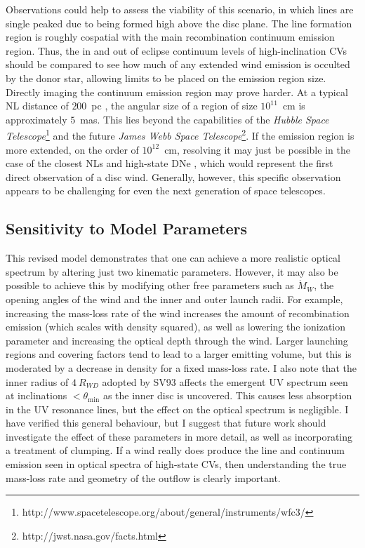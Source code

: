 Observations could help to assess the viability of this scenario, in which lines 
are single peaked due to being formed high above the disc plane. The line formation
region is roughly cospatial with the main recombination continuum emission region.
Thus, the in and out of eclipse continuum levels of high-inclination CVs should be 
compared to see how much of any extended wind emission is occulted by the 
donor star, allowing limits to be placed on
the emission region size. Directly imaging the continuum emission region may prove harder.
At a typical NL distance of $200$~pc \citep[e.g.][]{knigge2006,mizusawa2010}, 
the angular size of a region of size $10^{11}$~cm is approximately $5$~mas. This lies beyond the 
capabilities of the 
{\sl Hubble Space Telescope}\footnote{http://www.spacetelescope.org/about/general/instruments/wfc3/} 
and the future 
{\sl James Webb Space Telescope}\footnote{http://jwst.nasa.gov/facts.html}.
If the emission region is more extended, on the order of $10^{12}$~cm, resolving it may just 
be possible in the case of the closest NLs and high-state 
DNe \citep[at $\sim100$~pc, e.g.][]{millerjones2013}, which would represent 
the first direct observation of a disc wind. Generally, however, this specific
observation appears to be challenging for even the next generation of 
space telescopes.





\subsection{Sensitivity to Model Parameters}
\label{sec:cv_params}
This revised model demonstrates that one can achieve a more
realistic optical spectrum by altering just two kinematic parameters. 
However, it may also be possible to achieve this by modifying
other free parameters such as $\dot{M}_{W}$, the opening angles of the wind and the 
inner and outer launch radii. For example, increasing the mass-loss rate of the wind
increases the amount of recombination emission (which scales with density squared), 
as well as lowering the ionization parameter and increasing the optical depth through the wind. 
Larger launching regions and covering factors tend to lead to a larger emitting volume, 
but this is moderated by a decrease in density 
for a fixed mass-loss rate. I also note that the inner radius of $4~R_{WD}$ adopted by SV93 
affects the emergent UV spectrum seen at inclinations $<\theta_{\mathrm{min}}$ as 
the inner disc is uncovered. This causes less absorption in the UV resonance lines,
but the effect on the optical spectrum is negligible.
I have verified this general behaviour, but
I suggest that future work should investigate the effect of these parameters in more detail,
as well as incorporating a treatment of clumping.
If a wind really does produce the line and continuum emission seen in optical spectra of high-state CVs, then
understanding the true mass-loss rate and geometry of the outflow is clearly important.


